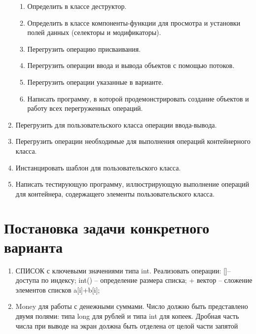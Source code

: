 \begin{enumerate}
\begin{enumerate}
            \item Определить в классе деструктор.
            \item Определить в классе компоненты-функции для просмотра и установки полей данных (селекторы и модификаторы).
            \item Перегрузить операцию присваивания.
            \item Перегрузить операции ввода и вывода объектов с помощью потоков.
            \item Перегрузить операции указанные в варианте.
            \item Написать программу, в которой продемонстрировать создание объектов и работу всех перегруженных операций.
        \end{enumerate}

        \item Перегрузить для пользовательского класса операции ввода-вывода.
        \item Перегрузить операции необходимые для выполнения операций контейнерного класса.
        \item Инстанцировать шаблон для пользовательского класса.
        \item Написать тестирующую программу, иллюстрирующую выполнение операций для контейнера, содержащего элементы пользовательского класса.
    \end{enumerate}
    \newpage
    \section{Постановка задачи конкретного варианта}
    \begin{enumerate}
     \item СПИСОК с ключевыми значениями типа int. Реализовать операции: []– доступа по индексу; int() – определение размера списка; + вектор – сложение элементов списков a[i]+b[i];
     \item Money для работы с денежными суммами. Число должно быть представлено двумя полями: типа long для рублей и типа int для копеек. Дробная часть числа при выводе на экран должна быть отделена от целой части запятой

    \end{enumerate}




